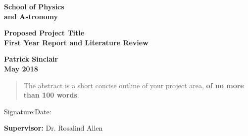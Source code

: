 \documentclass[a4paper,12pt]{article}
\begin{document}
\begin{minipage}[b]{110mm}
        {\Huge\bf School of Physics \\and Astronomy
        \vspace*{17mm}}
\end{minipage}
\hfill
\begin{minipage}[t]{40mm}               
\end{minipage}
\par\noindent                                           %
\vspace*{2cm}
\begin{center}
        \Large\bf Proposed Project Title\\
        \Large\bf First Year Report and Literature Review
\end{center}
\vspace*{1.5cm}
\begin{center}
        \bf Patrick Sinclair\\                 %
        May 2018                          %
\end{center}
\vspace*{5mm}
%
%                       
\begin{abstract}
        The abstract is a short concise outline of your 
        project area, {\bf of no more than 100 words}.
\end{abstract}

\vspace*{1cm}

\vspace*{3cm}
Signature:\hspace*{8cm}Date:

\vfill
{\bf Supervisor:} Dr. Rosalind Allen                %
\newpage
\setcounter{page}{1}                            %
\footruleheight{1pt}
\headruleheight{1pt}
\rhead{- \thepage}
\cfoot{}
%
\tableofcontents                                %
\pagebreak
\end{document}
